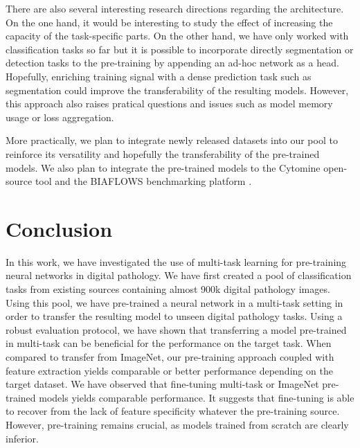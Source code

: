 There are also several interesting research directions regarding the architecture. On the one hand, it would be interesting to study the effect of increasing the capacity of the task-specific parts. On the other hand, we have only worked with classification tasks so far but it is possible to incorporate directly segmentation or detection tasks to the pre-training by appending an ad-hoc network as a head. Hopefully, enriching training signal with a dense prediction task such as segmentation could improve the transferability of the resulting models. However, this approach also raises pratical questions and issues such as model memory usage or loss aggregation. 

More practically, we plan to integrate newly released datasets into our pool to reinforce its versatility and hopefully the transferability of the pre-trained models. We also plan to integrate the pre-trained models %
to the Cytomine open-source tool \parencite{maree2016collaborative} and the BIAFLOWS benchmarking platform \parencite{rubens2019biaflows}.


\section{Conclusion}

In this work, we have investigated the use of multi-task learning for pre-training neural networks in digital pathology. We have first created a pool of classification tasks from existing sources containing almost 900k digital pathology images. Using this pool, we have pre-trained a neural network in a multi-task setting in order to transfer the resulting model to unseen digital pathology tasks. Using a robust evaluation protocol, we have shown that transferring a model pre-trained in multi-task can be beneficial for the performance on the target task. When compared to transfer from ImageNet, our pre-training approach coupled with feature extraction yields comparable or better performance depending on the target dataset. We have observed that fine-tuning multi-task or ImageNet pre-trained models yields comparable performance. It suggests that fine-tuning is able to recover from the lack of feature specificity whatever the pre-training source. However, pre-training remains crucial, as models trained from scratch are clearly inferior. 



